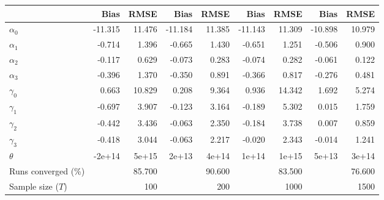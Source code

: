 
\begin{tabular}[t]{lrrrrrrrr}
\toprule
  & Bias & RMSE & Bias & RMSE & Bias & RMSE & Bias & RMSE\\
\midrule
$\alpha_{0}$ & -11.315 & 11.476 & -11.184 & 11.385 & -11.143 & 11.309 & -10.898 & 10.979\\
$\alpha_{1}$ & -0.714 & 1.396 & -0.665 & 1.430 & -0.651 & 1.251 & -0.506 & 0.900\\
$\alpha_{2}$ & -0.117 & 0.629 & -0.073 & 0.283 & -0.074 & 0.282 & -0.061 & 0.122\\
$\alpha_{3}$ & -0.396 & 1.370 & -0.350 & 0.891 & -0.366 & 0.817 & -0.276 & 0.481\\
$\gamma_{0}$ & 0.663 & 10.829 & 0.208 & 9.364 & 0.936 & 14.342 & 1.692 & 5.274\\
$\gamma_{1}$ & -0.697 & 3.907 & -0.123 & 3.164 & -0.189 & 5.302 & 0.015 & 1.759\\
$\gamma_{2}$ & -0.442 & 3.436 & -0.063 & 2.350 & -0.184 & 3.738 & 0.007 & 0.859\\
$\gamma_{3}$ & -0.418 & 3.044 & -0.063 & 2.217 & -0.020 & 2.343 & -0.014 & 1.241\\
$\theta$ & -2e+14 & 5e+15 & 2e+13 & 4e+14 & 1e+14 & 1e+15 & 5e+13 & 3e+14\\
Runs converged (\%) &  & 85.700 &  & 90.600 &  & 83.500 &  & 76.600\\
Sample size ($T$) &  & 100 &  & 200 &  & 1000 &  & 1500\\
\bottomrule
\end{tabular}
